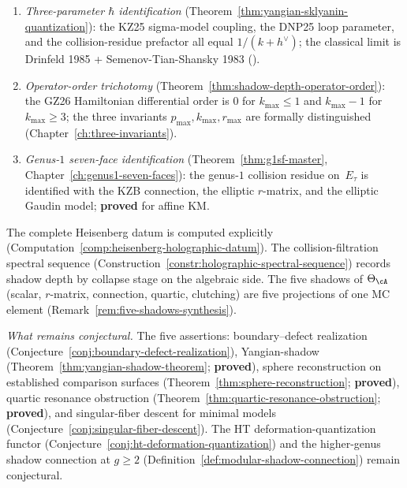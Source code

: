 \begin{enumerate}[label=\textup{(\alph*)}]
\item \emph{Three-parameter $\hbar$ identification}
 (Theorem~\ref{thm:yangian-sklyanin-quantization}): the KZ25 sigma-model
 coupling, the DNP25 loop parameter, and the collision-residue prefactor
 all equal $1/(k+h^\vee)$; the classical limit is Drinfeld 1985 +
 Semenov-Tian-Shansky 1983 (\ClaimStatusProvedElsewhere).
\item \emph{Operator-order trichotomy}
 (Theorem~\ref{thm:shadow-depth-operator-order}): the GZ26 Hamiltonian
 differential order is $0$ for $k_{\max} \leq 1$ and $k_{\max}-1$ for
 $k_{\max}\geq 3$; the three invariants $p_{\max},k_{\max},r_{\max}$
 are formally distinguished
 (Chapter~\ref{ch:three-invariants}).
\item \emph{Genus-$1$ seven-face identification}
 (Theorem~\ref{thm:g1sf-master},
 Chapter~\ref{ch:genus1-seven-faces}): the genus-$1$ collision
 residue on~$E_\tau$ is identified with the KZB connection,
 the elliptic $r$-matrix, and the elliptic Gaudin model;
 \textbf{proved} for affine KM.
\end{enumerate}
The complete Heisenberg datum is computed explicitly
(Computation~\ref{comp:heisenberg-holographic-datum}).
The collision-filtration spectral sequence
(Construction~\ref{constr:holographic-spectral-sequence})
records shadow depth by collapse stage on the algebraic side.
The five shadows of $\Theta_\cA$ (scalar, $r$-matrix, connection,
quartic, clutching) are five projections of one MC element
(Remark~\ref{rem:five-shadows-synthesis}).

\noindent\emph{What remains conjectural.}
The five assertions:
boundary--defect realization
(Conjecture~\ref{conj:boundary-defect-realization}),
Yangian-shadow
(Theorem~\ref{thm:yangian-shadow-theorem}; \textbf{proved}),
sphere reconstruction on established comparison surfaces
(Theorem~\ref{thm:sphere-reconstruction}; \textbf{proved}),
quartic resonance obstruction
(Theorem~\ref{thm:quartic-resonance-obstruction}; \textbf{proved}), and
singular-fiber descent for minimal models
(Conjecture~\ref{conj:singular-fiber-descent}).
The HT deformation-quantization functor
(Conjecture~\ref{conj:ht-deformation-quantization}) and the
higher-genus shadow connection at $g \geq 2$
(Definition~\ref{def:modular-shadow-connection}) remain
conjectural.

